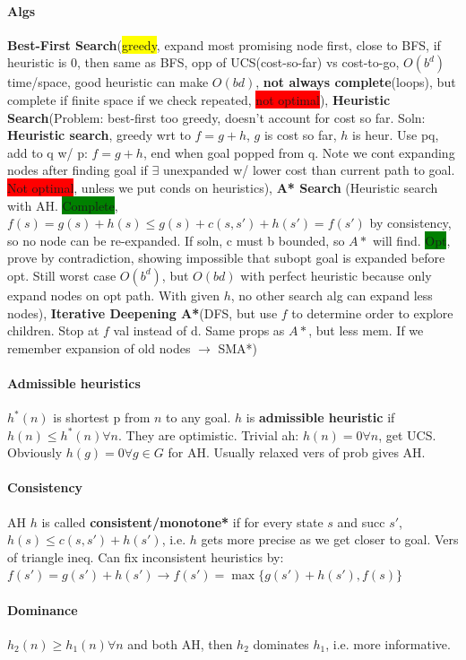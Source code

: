 \paragraph{Algs} \textbf{Best-First Search}(\colorbox{yellow}{greedy}, expand most
promising node first, close to BFS, if heuristic is 0, then same as
BFS, opp of UCS(cost-so-far) vs cost-to-go, $O(b^d)$ time/space, good
heuristic can make $O(bd)$, \textbf{not always complete}(loops), but
complete if finite space if we check repeated, \colorbox{red}{not optimal}), \textbf{Heuristic
  Search}(Problem: best-first 
too greedy, doesn't account for cost so far. Soln: \textbf{Heuristic
  search}, greedy wrt to $f = g+h$, $g$ is cost so far, $h$ is
heur. Use pq, add to q w/ p: $f = g + h$, end when goal popped
from q. Note we cont expanding nodes after finding goal if
$\exists$ unexpanded w/ lower cost than current path to goal. \colorbox{red}{Not
optimal}, unless we put conds on heuristics),
\textbf{A* Search} (Heuristic search with AH. \colorbox{green}{Complete},
$f(s)=g(s)+h(s)\leq g(s)+c(s,s')+h(s')=f(s')$ by consistency, so no
node can be re-expanded. If soln, c must b bounded, so $A*$ will
find. \colorbox{green}{Opt}, prove by contradiction, showing impossible that subopt
goal is expanded before opt. Still worst case $O(b^d)$, but $O(bd)$
with perfect heuristic because only expand nodes on opt path. With
given $h$, no other search alg can expand less nodes),
\textbf{Iterative Deepening A*}(DFS, but use $f$ to determine order to
explore children. Stop at $f$ val instead of d. Same props as $A*$, but less
mem. If we remember expansion of old nodes $\to$ SMA*)
\paragraph{Admissible heuristics} $h^*(n)$ is shortest p from $n$ to
any goal. $h$ is \textbf{admissible heuristic} if $h(n) \leq h^*(n)
\forall n$. They are optimistic. Trivial ah: $h(n)=0 \forall n$, get
UCS. Obviously $h(g)=0 \forall g \in G$ for AH. Usually relaxed vers
of prob gives AH.
\paragraph{Consistency} AH $h$ is called \textbf{consistent/monotone*}
if for every state $s$ and succ $s'$, $h(s) \leq c(s,s') + h(s')$,
i.e. $h$ gets more precise as we get closer to goal. Vers of triangle
ineq. Can fix inconsistent heuristics by: $f(s')=g(s')+h(s') \to
f(s')=\max\{g(s')+h(s'),f(s)\}$
\paragraph{Dominance} $h_2(n) \geq h_1(n) \forall n$ and both AH, then
$h_2$ dominates $h_1$, i.e. more informative.
